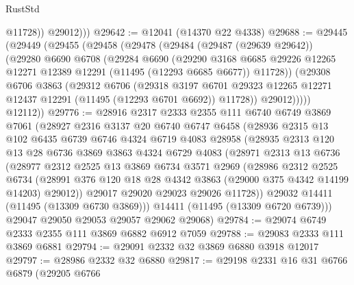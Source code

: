 \begin{lexlean}{RustStd}
\begin{coremodule}
              @11728))
          @29012)))
@29642 := @12041 (@14370 @22 @4338)
@29688 := @29445
    (@29449
      (@29455
        (@29458
          (@29478
            (@29484
              (@29487 (@29639 @29642))
              (@29280
                @6690
                @6708
                (@29284
                  @6690
                  (@29290
                    @3168
                    @6685
                    @29226
                    @12265
                    @12271
                    @12389
                    @12291
                    (@11495 (@12293 @6685 @6677))
                    @11728))
                (@29308
                  @6706
                  @3863
                  (@29312
                    @6706
                    (@29318
                      @3197
                      @6701
                      @29323
                      @12265
                      @12271
                      @12437
                      @12291
                      (@11495 (@12293 @6701 @6692))
                      @11728))
                  @29012)))))
        @12112))
@29776 := @28916
    @2317
    @2333
    @2355
    @111
    @6740
    @6749
    @3869
    @7061
    (@28927
      @2316
      @3137
      @20
      @6740
      @6747
      @6458
      (@28936
        @2315
        @13
        @102
        @6435
        @6739
        @6746
        @4324
        @6719
        @4083
        @28958
        (@28935
          @2313
          @120
          @13
          @28
          @6736
          @3869
          @3863
          @4324
          @6729
          @4083
          (@28971
            @2313
            @13
            @6736
            (@28977
              @2312
              @2525
              @13
              @3869
              @6734
              @3571
              @2969
              (@28986
                @2312
                @2525
                @6734
                (@28991 @376 @120 @18 @28 @4342 @3863 (@29000 @375 @4342 @14199 @14203) @29012))
              @29017
              @29020
              @29023
              @29026
              @11728))
          @29032
          @14411
          (@11495 (@13309 @6730 @3869)))
        @14411
        (@11495 (@13309 @6720 @6739)))
      @29047
      @29050
      @29053
      @29057
      @29062
      @29068)
@29784 := @29074 @6749 @2333 @2355 @111 @3869 @6882 @6912 @7059
@29788 := @29083 @2333 @111 @3869 @6881
@29794 := @29091 @2332 @32 @3869 @6880 @3918 @12017
@29797 := @28986 @2332 @32 @6880
@29817 := @29198
    @2331
    @16
    @31
    @6766
    @6879
    (@29205
      @6766

\end{coremodule}
\end{lexlean}
